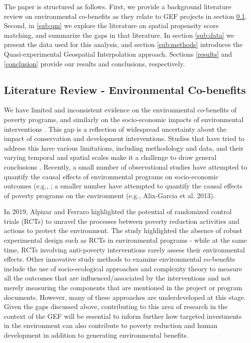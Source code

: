 \documentclass[sustainability,article,submit,moreauthors,pdftex]{Definitions/mdpi}
\begin{document}
\par
The paper is structured as follows.  First, we provide a background literature review on environmental co-benefits as they relate to GEF projects in section \ref{sub:cobenefits}.  Second, in \ref{sub:qm} we explore the literature on spatial propensity score matching, and summarize the gaps in that literature.  In section \ref{sub:data} we present the data used for this analysis, and section \ref{sub:methods} introduces the Quasi-experimental Geospatial Interpolation approach.  Sections \ref{results} and \ref{conclusion} provide our results and conclusions, respectively.


\subsection{Literature Review - Environmental Co-benefits}\label{sub:cobenefits}
We have limited and inconsistent evidence on the environmental co-benefits of poverty programs, and similarly on the socio-economic impacts of environmental interventions \cite{AlpizarTheRCTs, Naidoo2019EvaluatingWorld, McKinnon2016WhatCountries}. This gap is a reflection of widespread uncertainty about the impact of conservation and development interventions. Studies that have tried to address this have various limitations, including methodology and data, and their varying temporal and spatial scales make it a challenge to draw general conclusions \cite{Naidoo2019EvaluatingWorld, AlpizarTheRCTs}. Recently, a small number of observational studies have attempted to quantify the causal effects of environmental programs on socio-economic outcomes (e.g., \cite{Oldekop2019ReductionsNepal, Naidoo2019EvaluatingWorld, Ferraro2014QuantifyingInfrastructure}; a smaller number have attempted to quantify the causal effects of poverty programs on the environment (e.g., Alix-Garcia et al. 2013). 
\par
In 2019, Alpizar and Ferraro \cite{AlpizarTheRCTs} highlighted the potential of randomized control trials (RCTs) to unravel the processes between poverty reduction activities and actions to protect the environment. The study highlighted the absence of robust experimental design such as RCTs in environmental programs - while at the same time, RCTs involving anti-poverty interventions rarely assess their environmental effects.  Other innovative study methods to examine environmental co-benefits include the use of socio-ecological approaches and complexity theory to measure all the outcomes that are influenced/associated by the interventions and not merely measuring the components that are mentioned in the project or program documents. However, many of these approaches are underdeveloped at this stage.  Given the gaps discussed above, contributing to this area of research in the context of the GEF will be essential to inform further how targeted investments in the environment can also contribute to poverty reduction and human development in addition to generating environmental benefits.
\end{document}
